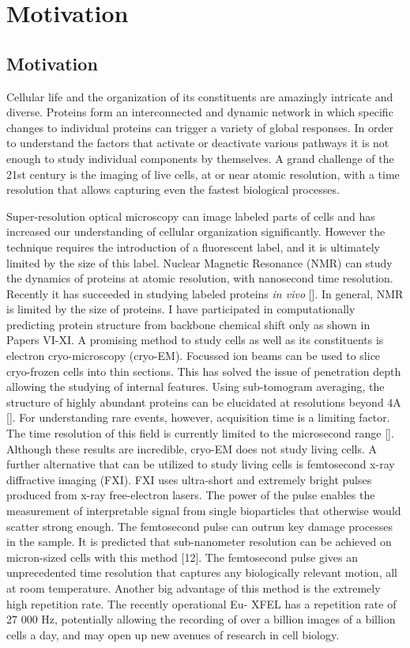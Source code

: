 \part{Motivation}
\chapter{Motivation}
Cellular life and the organization of its constituents are amazingly intricate and diverse. Proteins form an interconnected and dynamic network in which specific changes to individual proteins can trigger a variety of global responses. In order to understand the factors that activate or deactivate various pathways it is not enough to study individual components by themselves. A grand challenge of the 21st century is the imaging of live cells, at or near atomic resolution, with a time resolution that allows capturing even the fastest biological processes. 

Super-resolution optical microscopy can image labeled parts of cells and has increased our understanding of cellular organization significantly. However the technique requires the introduction of a fluorescent label, and it is ultimately limited by the size of this label. Nuclear Magnetic Resonance (NMR) can study the dynamics of proteins at atomic resolution, with nanosecond time resolution. Recently it has succeeded in studying labeled proteins \textit{in vivo} []. In general, NMR is limited by the size of proteins. I have participated in computationally predicting protein structure from backbone chemical shift only as shown in Papers VI-XI. A promising method to study cells as well as its constituents is electron cryo-microscopy (cryo-EM). Focussed ion beams can be used to slice cryo-frozen cells into thin sections. This has solved the issue of penetration depth allowing the studying of internal features. Using sub-tomogram averaging, the structure of highly abundant proteins can be elucidated at resolutions beyond 4A []. For understanding rare events, however, acquisition time is a limiting factor. The time resolution of this field is currently limited to the microsecond range []. Although these results are incredible, cryo-EM does not study living cells. A further alternative that can be utilized to study living cells is femtosecond x-ray diffractive imaging (FXI). FXI uses ultra-short and extremely bright pulses produced from x-ray free-electron lasers. The power of the pulse enables the measurement of interpretable signal from single bioparticles that otherwise would scatter strong enough. The femtosecond pulse can outrun key damage processes in the sample. It is predicted that sub-nanometer resolution can be achieved on micron-sized cells with this method [12]. The femtosecond pulse gives an unprecedented time resolution that captures any biologically relevant motion, all at room temperature. Another big advantage of this method is the extremely high repetition rate. The recently operational Eu- XFEL has a repetition rate of 27 000 Hz, potentially allowing the recording of over a billion images of a billion cells a day, and may open up new avenues of research in cell biology. 

